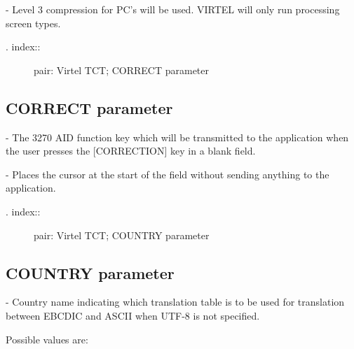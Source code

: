 \documentclass[letterpaper,10pt,english]{sphinxmanual}
\begin{document}
 - Level 3 compression for PC’s will be used. VIRTEL will only run processing screen types.
\begin{description}
\item[{. index::}] \leavevmode
pair: Virtel TCT; CORRECT parameter

\end{description}


\subsection{CORRECT parameter}
\label{\detokenize{Installation_Guide:correct-parameter}}
\begin{sphinxVerbatim}[commandchars=\\\{\}]
  
\end{sphinxVerbatim}

 - The 3270 AID function key which will be transmitted to the application when the user presses the {[}CORRECTION{]} key in a blank field.

 - Places the cursor at the start of the field without sending anything to the application.
\begin{description}
\item[{. index::}] \leavevmode
pair: Virtel TCT; COUNTRY parameter

\end{description}


\subsection{COUNTRY parameter}
\label{\detokenize{Installation_Guide:country-parameter}}
\begin{sphinxVerbatim}[commandchars=\\\{\}]
 
\end{sphinxVerbatim}

 - Country name indicating which translation table is to be used for translation between EBCDIC and ASCII when UTF-8 is not specified.

Possible values are:
\end{document}
